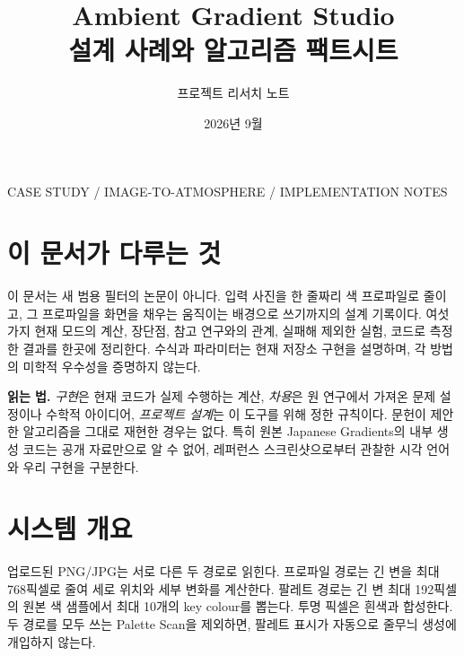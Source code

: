 \documentclass[10pt]{article}
\title{Ambient Gradient Studio\\[-.2em]\large 설계 사례와 알고리즘 팩트시트}
\author{프로젝트 리서치 노트}
\date{2026년 9월}
\newcommand{\tagline}[1]{\textcolor{moss}{\small\textsf{#1}}}
\begin{document}
\maketitle
\vspace{-1.5em}
\begin{center}\tagline{CASE STUDY \quad / \quad IMAGE-TO-ATMOSPHERE \quad / \quad IMPLEMENTATION NOTES}\end{center}

\section*{이 문서가 다루는 것}
이 문서는 새 범용 필터의 논문이 아니다. 입력 사진을 한 줄짜리 색 프로파일로 줄이고, 그 프로파일을 화면을 채우는 움직이는 배경으로 쓰기까지의 설계 기록이다. 여섯 가지 현재 모드의 계산, 장단점, 참고 연구와의 관계, 실패해 제외한 실험, 코드로 측정한 결과를 한곳에 정리한다. 수식과 파라미터는 현재 저장소 구현을 설명하며, 각 방법의 미학적 우수성을 증명하지 않는다.

\begin{center}
\colorbox{paper}{\begin{minipage}{.94\linewidth}
\textbf{읽는 법.} \textit{구현}은 현재 코드가 실제 수행하는 계산, \textit{차용}은 원 연구에서 가져온 문제 설정이나 수학적 아이디어, \textit{프로젝트 설계}는 이 도구를 위해 정한 규칙이다. 문헌이 제안한 알고리즘을 그대로 재현한 경우는 없다. 특히 원본 Japanese Gradients의 내부 생성 코드는 공개 자료만으로 알 수 없어, 레퍼런스 스크린샷으로부터 관찰한 시각 언어와 우리 구현을 구분한다.
\end{minipage}}
\end{center}

\section{시스템 개요}
업로드된 PNG/JPG는 서로 다른 두 경로로 읽힌다. 프로파일 경로는 긴 변을 최대 768픽셀로 줄여 세로 위치와 세부 변화를 계산한다. 팔레트 경로는 긴 변 최대 192픽셀의 원본 색 샘플에서 최대 10개의 key colour를 뽑는다. 투명 픽셀은 흰색과 합성한다. 두 경로를 모두 쓰는 Palette Scan을 제외하면, 팔레트 표시가 자동으로 줄무늬 생성에 개입하지 않는다.
\end{document}
